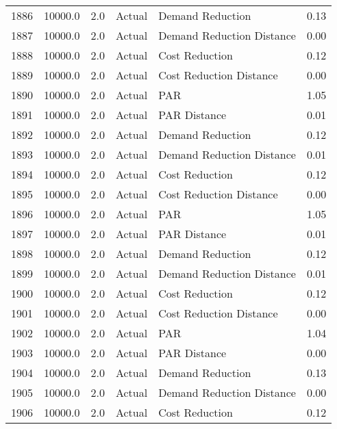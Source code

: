 \begin{longtable}{lrrllr}
1886 &      10000.0 &     2.0 &         Actual &           Demand Reduction &   0.13 \\
1887 &      10000.0 &     2.0 &         Actual &  Demand Reduction Distance &   0.00 \\
1888 &      10000.0 &     2.0 &         Actual &             Cost Reduction &   0.12 \\
1889 &      10000.0 &     2.0 &         Actual &    Cost Reduction Distance &   0.00 \\
1890 &      10000.0 &     2.0 &         Actual &                        PAR &   1.05 \\
1891 &      10000.0 &     2.0 &         Actual &               PAR Distance &   0.01 \\
1892 &      10000.0 &     2.0 &         Actual &           Demand Reduction &   0.12 \\
1893 &      10000.0 &     2.0 &         Actual &  Demand Reduction Distance &   0.01 \\
1894 &      10000.0 &     2.0 &         Actual &             Cost Reduction &   0.12 \\
1895 &      10000.0 &     2.0 &         Actual &    Cost Reduction Distance &   0.00 \\
1896 &      10000.0 &     2.0 &         Actual &                        PAR &   1.05 \\
1897 &      10000.0 &     2.0 &         Actual &               PAR Distance &   0.01 \\
1898 &      10000.0 &     2.0 &         Actual &           Demand Reduction &   0.12 \\
1899 &      10000.0 &     2.0 &         Actual &  Demand Reduction Distance &   0.01 \\
1900 &      10000.0 &     2.0 &         Actual &             Cost Reduction &   0.12 \\
1901 &      10000.0 &     2.0 &         Actual &    Cost Reduction Distance &   0.00 \\
1902 &      10000.0 &     2.0 &         Actual &                        PAR &   1.04 \\
1903 &      10000.0 &     2.0 &         Actual &               PAR Distance &   0.00 \\
1904 &      10000.0 &     2.0 &         Actual &           Demand Reduction &   0.13 \\
1905 &      10000.0 &     2.0 &         Actual &  Demand Reduction Distance &   0.00 \\
1906 &      10000.0 &     2.0 &         Actual &             Cost Reduction &   0.12 \\

\end{longtable}
